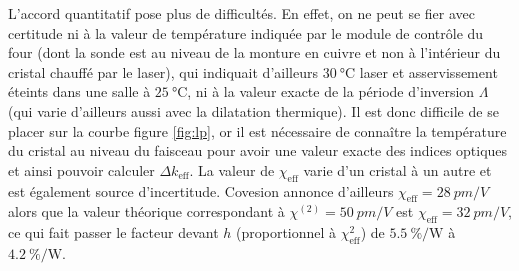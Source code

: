\documentclass[11pt,a4paper]{article}
\newcommand{\chie}{\chi_\mathsc{eff}}
\newcommand{\dke}{\Delta k_\mathsc{eff}}
\newcommand{\mathsc}[1]{\mathrm{\scriptscriptstyle {#1}}}
\begin{document}
L'accord quantitatif pose plus de difficultés. En effet, on ne peut se fier avec certitude ni à la valeur de température indiquée par le module de contrôle du four (dont la sonde est au niveau de la monture en cuivre et non à l'intérieur du cristal chauffé par le laser), qui indiquait d'ailleurs $\SI{30}{\celsius}$ laser et asservissement éteints dans une salle à $\SI{25}{\celsius}$, ni à la valeur exacte de la période d'inversion $\Lambda$ (qui varie d'ailleurs aussi avec la dilatation thermique). Il est donc difficile de se placer sur la courbe figure \ref{fig:lp}, or il est nécessaire de connaître la température du cristal au niveau du faisceau pour avoir une valeur exacte des indices optiques et ainsi pouvoir calculer $\dke$.
La valeur de $\chie$ varie d'un cristal à un autre et est également source d'incertitude. Covesion annonce d'ailleurs $\chie = \SI{28}{pm/V}$ alors que la valeur théorique correspondant à $\chi^{(2)}=\SI{50}{pm/V}$ est $\chie = \SI{32}{pm/V}$, ce qui fait passer le facteur devant $h$ (proportionnel à $\chie^2$) de $\SI{5.5}{\percent\per\watt}$ à $\SI{4.2}{\percent\per\watt}$.

\end{document}
